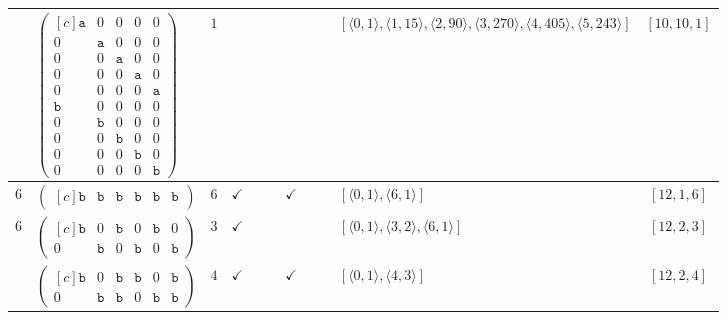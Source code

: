 \documentclass[12pt]{article}
\theoremstyle{definition}
\theoremstyle{plain}
\begin{document}
{\begin{longtable}{@{}cYcccccccZc@{}}
& $\begin{pmatrix*}[c]
\mathtt{a}  &  0  &  0  &  0  &  0  \\
0  &  \mathtt{a}  &  0  &  0  &  0  \\
0  &  0  &  \mathtt{a}  &  0  &  0  \\
0  &  0  &  0  &  \mathtt{a}  &  0  \\
0  &  0  &  0  &  0  &  \mathtt{a}  \\
\mathtt{b}  &  0  &  0  &  0  &  0  \\
0  &  \mathtt{b}  &  0  &  0  &  0  \\
0  &  0  &  \mathtt{b}  &  0 &  0   \\
0  &  0  &  0  &  \mathtt{b}  &  0  \\
0  &  0  &  0  &  0  &  \mathtt{b}
\end{pmatrix*}$
& $1$
&
&
&
&
&
&
& $[\langle0,1\rangle,\allowbreak\langle1,15\rangle,\allowbreak\langle2,90\rangle,\allowbreak\langle3,270\rangle,\allowbreak\langle4,405\rangle,\allowbreak\langle5,243\rangle]$
& $[10,10,1]$\\

\midrule[\heavyrulewidth]

$6$
& $\begin{pmatrix*}[c]
\mathtt{b}   &  \mathtt{b}    &  \mathtt{b}    &   \mathtt{b}  &  \mathtt{b}  &  \mathtt{b}
\end{pmatrix*}$
& $6$
& $\checkmark$
&
&
& $\checkmark$
&
&
& $[\langle0,1\rangle,\allowbreak\langle6,1\rangle]$
& $[12,1,6]$     \\

\cmidrule(lr){2-11}

$6$
& $\begin{pmatrix*}[c]
\mathtt{b}  &  0  &  \mathtt{b}  &  0  &  \mathtt{b}  &  0  \\
0  &  \mathtt{b}  &  0  &  \mathtt{b}  &  0  &  \mathtt{b}
\end{pmatrix*}$
& $3$
& $\checkmark$
&
&
&
&
&
& $[\langle0,1\rangle,\allowbreak\langle3,2\rangle,\allowbreak\langle6,1\rangle]$
& $[12,2,3]$\\

\cmidrule(lr){2-11}

& $\begin{pmatrix*}[c]
\mathtt{b}  &  0  &  \mathtt{b}  &  \mathtt{b}  &  0  &  \mathtt{b}    \\
0  &  \mathtt{b}  &  \mathtt{b}  &  0  &  \mathtt{b}  &  \mathtt{b}
\end{pmatrix*}$
& $4$
& $\checkmark$
&
&
& $\checkmark$
&
&
& $[\langle0,1\rangle,\allowbreak\langle4,3\rangle]$
& $[12,2,4]$     \\


\end{longtable}}
\end{document}
